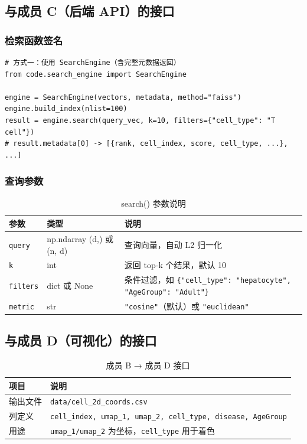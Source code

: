 \documentclass[12pt,a4paper]{ctexart}
\begin{document}
\subsection{与成员 C（后端 API）的接口}

\subsubsection{检索函数签名}

\begin{lstlisting}
# 方式一：使用 SearchEngine（含完整元数据返回）
from code.search_engine import SearchEngine

engine = SearchEngine(vectors, metadata, method="faiss")
engine.build_index(nlist=100)
result = engine.search(query_vec, k=10, filters={"cell_type": "T cell"})
# result.metadata[0] -> [{rank, cell_index, score, cell_type, ...}, ...]
\end{lstlisting}

\subsubsection{查询参数}

\begin{table}[H]
\centering
\caption{search() 参数说明}
\begin{tabular}{l|l|p{6cm}}
\toprule
\textbf{参数} & \textbf{类型} & \textbf{说明} \\
\midrule
\texttt{query}   & np.ndarray (d,) 或 (n, d) & 查询向量，自动 L2 归一化 \\
\texttt{k}       & int                       & 返回 top-k 个结果，默认 10 \\
\texttt{filters} & dict 或 None              & 条件过滤，如 \texttt{\{"cell\_type": "hepatocyte", "AgeGroup": "Adult"\}} \\
\texttt{metric}  & str                       & \texttt{"cosine"}（默认）或 \texttt{"euclidean"} \\
\bottomrule
\end{tabular}
\end{table}

\subsection{与成员 D（可视化）的接口}

\begin{table}[H]
\centering
\caption{成员 B → 成员 D 接口}
\begin{tabular}{l|p{8cm}}
\toprule
\textbf{项目} & \textbf{说明} \\
\midrule
输出文件     & \texttt{data/cell\_2d\_coords.csv} \\
列定义       & \texttt{cell\_index, umap\_1, umap\_2, cell\_type, disease, AgeGroup} \\
用途         & \texttt{umap\_1/umap\_2} 为坐标，\texttt{cell\_type} 用于着色 \\
\bottomrule
\end{tabular}
\end{table}
\end{document}
